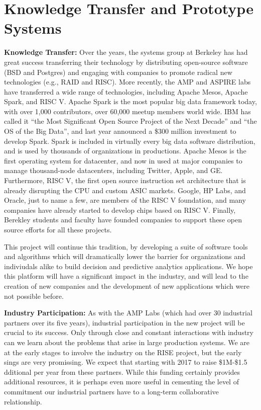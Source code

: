 \section{Knowledge Transfer and Prototype Systems}

{\bf Knowledge Transfer:} Over the years, the systems group at Berkeley has had great success transferring their technology by distributing open-source software (\eg BSD and Postgres) and engaging with companies to promote radical new technologies (e.g., RAID and RISC).  More recently, the AMP and ASPIRE labs have transferred a wide range of technologies, including Apache Mesos, Apache Spark, and RISC V. Apache Spark is the most popular big data framework today, with over 1,000 contributors, over 60,000 meetup members world wide. IBM has called it “the Most Significant Open Source Project of the Next Decade” and “the OS of the Big Data”, and last year announced a \$300 million investment to develop Spark. Spark is included in virtually every big data software distribution, and is used by thousands of organizations in productions. Apache Mesos is the first operating system for datacenter, and now in used at major companies to manage thousand-node datacenters, including Twitter, Apple, and GE.  Furthermore, RISC V, the first open source instruction set architecture that is already disrupting the CPU and custom ASIC markets. Google, HP Labs, and Oracle, just to name a few, are members of the RISC V foundation, and many companies have already started to develop chips based on RISC V. Finally, Berekley students and faculty have founded companies to support these open source efforts for all these projects.

This project will continue this tradition, by developing a suite of software tools and algorithms which will dramatically lower the barrier for organizations and indiviudals alike to build decision and predictive analytics applications. We hope this platform will have a significant impact in the industry, and will lead to the creation of new companies and the development of new applications which were not possible before.


{\bf Industry Participation:} As with the AMP  Labs (which had over 30 industrial partners over its five years), industrial participation in the new project will be crucial to its success.  Only through close and constant interactions with industry can we learn about the problems that arise in large production systems.  We are at the early stages to involve the industry on the RISE project, but the early sings are very promissing. We expect that starting with 2017 to raise \$1M-\$1.5 dditional per year from these partners. While this funding certainly provides additional resources, it is perhaps even more useful in cementing the level of commitment our industrial partners have to a long-term collaborative relationship.

